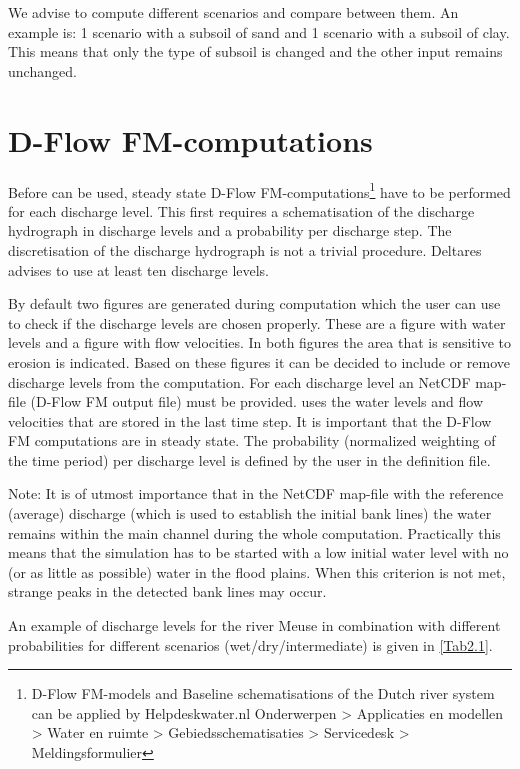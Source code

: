 We advise to compute different scenarios and compare between them.
An example is: 1 scenario with a subsoil of sand and 1 scenario with a subsoil of clay.
This means that only the type of subsoil is changed and the other input remains unchanged.

\section{D-Flow FM-computations}

Before \dfastbe can be used, steady state D-Flow FM-computations\footnote{D-Flow FM-models and Baseline schematisations of the Dutch river system can be applied by Helpdeskwater.nl Onderwerpen > Applicaties en modellen > Water en ruimte > Gebiedsschematisaties > Servicedesk > Meldingsformulier} have to be performed for each discharge level.
This first requires a schematisation of the discharge hydrograph in discharge levels and a probability per discharge step.
The discretisation of the discharge hydrograph is not a trivial procedure.
Deltares advises to use at least ten discharge levels.

By default two figures are generated during \dfastbe computation which the user can use to check if the discharge levels are chosen properly.
These are a figure with water levels and a figure with flow velocities.
In both figures the area that is sensitive to erosion is indicated.
Based on these figures it can be decided to include or remove discharge levels from the computation.
For each discharge level an NetCDF map-file (D-Flow FM output file) must be provided.
\dfastbe uses the water levels and flow velocities that are stored in the last time step.
It is important that the D-Flow FM computations are in steady state.
The probability (normalized weighting of the time period) per discharge level is defined by the user in the definition file.

Note: It is of utmost importance that in the NetCDF map-file with the reference (average) discharge (which is used to establish the initial bank lines) the water remains within the main channel during the whole computation.
Practically this means that the simulation has to be started with a low initial water level with no (or as little as possible) water in the flood plains.
When this criterion is not met, strange peaks in the detected bank lines may occur.



An example of discharge levels for the river Meuse in combination with different probabilities for different scenarios (wet/dry/intermediate) is given in \autoref{Tab2.1}.

